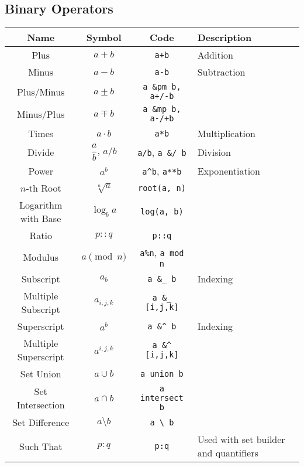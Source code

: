 \documentclass{article}
\begin{document}
  \newpage

  \subsection{Binary Operators} %
  \label{sub:binary_ops}
  \begin{table}[!h]
    \centering
    \begin{tabular}{|c|c|c|l|}
      \hline
      \textbf{Name} & \textbf{Symbol} & \textbf{Code} & \textbf{Description} \\
      \hline\hline

      Plus & \( a + b \) & \texttt{a+b} & Addition \\
      Minus & \( a - b \) & \texttt{a-b} & Subtraction \\
      Plus/Minus & \( a \pm b \) & \texttt{a \&pm b, a+/-b} & \\
      Minus/Plus & \( a \mp b \) & \texttt{a \&mp b, a-/+b} & \\
      Times & \( a \cdot b \) & \texttt{a*b} & Multiplication \\
      Divide & \( \dfrac{a}{b} \), \( a/b \) & \texttt{a/b}, \texttt{a \&/ b} & Division \\
      Power & \( a^b \) & \texttt{a\^{}b}, \texttt{a**b} & Exponentiation \\
      \( n \)-th Root & \( \sqrt[n]{a} \) & \texttt{root(a, n)} & \\
      Logarithm with Base & \( \log_b{a} \) & \texttt{log(a, b)} & \\
      Ratio & \( p :: q \) & \texttt{p::q} & \\
      Modulus & \( a \pmod{n} \) & \texttt{a\%n}, \texttt{a mod n} & \\
      \hline
      Subscript & \( a_b \) & \texttt{a \&\_ b} & Indexing \\
      Multiple Subscript & \( a_{i,j,k} \) & \texttt{a \&\_ [i,j,k]} & \\
      Superscript & \( a^b \) & \texttt{a \&\^{} b} & Indexing \\
      Multiple Superscript & \( a^{i,j,k} \) & \texttt{a \&\^{} [i,j,k]} & \\
      \hline
      Set Union & \( a \cup b \) & \texttt{a union b} & \\
      Set Intersection & \( a \cap b \) & \texttt{a intersect b} & \\
      Set Difference & \( a \setminus b \) & \texttt{a \textbackslash \ b} & \\
      Such That & \( p : q \) & \texttt{p:q} & Used with set builder and quantifiers \\

\end{tabular}
\end{table}
\end{document}
